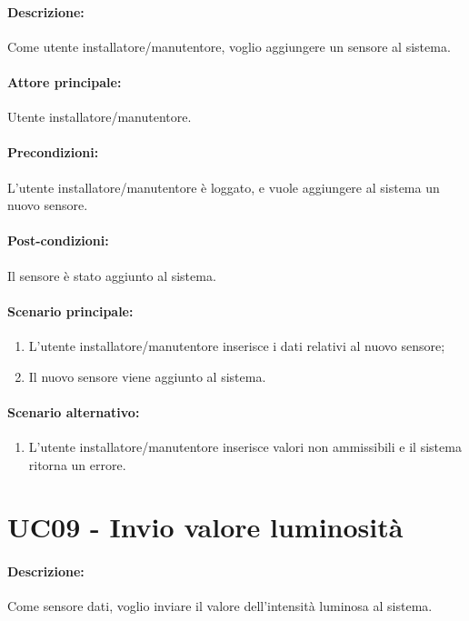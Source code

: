 \paragraph{Descrizione:}
Come utente installatore/manutentore, voglio aggiungere un sensore al sistema.

\paragraph{Attore principale:}
Utente installatore/manutentore.

\paragraph{Precondizioni:}
L'utente installatore/manutentore è loggato, e vuole aggiungere al sistema un nuovo sensore.

\paragraph{Post-condizioni:}
Il sensore è stato aggiunto al sistema.

\paragraph{Scenario principale:}
\begin{enumerate}
    \item L'utente installatore/manutentore inserisce i dati relativi al nuovo sensore;
    \item Il nuovo sensore viene aggiunto al sistema.
\end{enumerate}

\paragraph{Scenario alternativo:}
\begin{enumerate}
    \item L'utente installatore/manutentore inserisce valori non ammissibili e il sistema ritorna un errore.
\end{enumerate}


\section{UC09 - Invio valore luminosità}

\paragraph{Descrizione:}
Come sensore dati, voglio inviare il valore dell'intensità luminosa al sistema.

